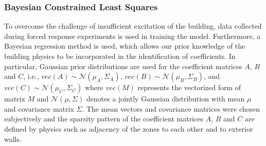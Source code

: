 \subsubsection{Bayesian Constrained Least Squares}

To overcome the challenge of insufficient excitation of the building, data collected during forced response experiments is used in training the model. Furthermore, 
a Bayesian regression method is used, which allows our prior knowledge of the building physics to be incorporated in the identification of coefficients. 
In particular, Gaussian prior distributions are used for the coefficient matrices $A$, $B$ and $C$, i.e., $vec(A) \sim \mathcal{N}( \mu_A, \Sigma_A)$, $vec(B) \sim \mathcal{N}( \mu_B, \Sigma_B)$, and $vec(C) \sim \mathcal{N}( \mu_C, \Sigma_C)$ where $vec(M)$ represents the vectorized form of matrix $M$ and $\mathcal{N}( \mu, \Sigma)$ denotes a jointly Gaussian distribution with mean $\mu$ and covariance matrix $\Sigma$. 
The mean vectors and covariance matrices were chosen subjectively and the sparsity pattern of the coefficient matrices $A$, $B$ and $C$ are defined by physics such as adjacency of the zones to each other and to exterior walls.

%

